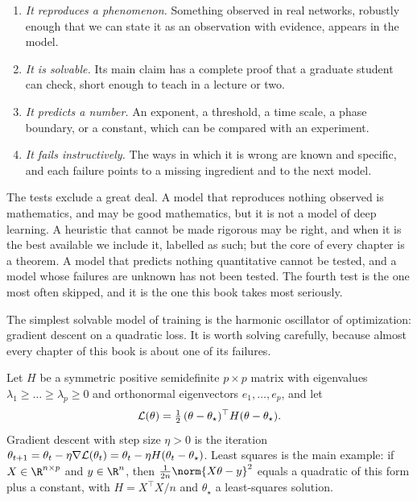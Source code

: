 \begin{refsection}
\begin{enumerate}
\item \emph{It reproduces a phenomenon.} Something observed in real networks, robustly enough that we can state it as an observation with evidence, appears in the model.
\item \emph{It is solvable.} Its main claim has a complete proof that a graduate student can check, short enough to teach in a lecture or two.
\item \emph{It predicts a number.} An exponent, a threshold, a time scale, a phase boundary, or a constant, which can be compared with an experiment.
\item \emph{It fails instructively.} The ways in which it is wrong are known and specific, and each failure points to a missing ingredient and to the next model.
\end{enumerate}

The tests exclude a great deal. A model that reproduces nothing observed is mathematics, and may be good mathematics, but it is not a model of deep learning. A heuristic that cannot be made rigorous may be right, and when it is the best available we include it, labelled as such; but the core of every chapter is a theorem. A model that predicts nothing quantitative cannot be tested, and a model whose failures are unknown has not been tested. The fourth test is the one most often skipped, and it is the one this book takes most seriously.


The simplest solvable model of training is the harmonic oscillator of optimization: gradient descent on a quadratic loss. It is worth solving carefully, because almost every chapter of this book is about one of its failures.

Let $H$ be a symmetric positive semidefinite $p\times p$ matrix with eigenvalues $\lambda_1\ge\dots\ge\lambda_p\ge0$ and orthonormal eigenvectors $e_1,\dots,e_p$, and let
\[
  \mathcal{L}(\theta)=\tfrac12\,(\theta-\theta_\star)^\top H(\theta-\theta_\star).
\]
Gradient descent with step size $\eta>0$ is the iteration $\theta_{t+1}=\theta_t-\eta\nabla\mathcal{L}(\theta_t)=\theta_t-\eta H(\theta_t-\theta_\star)$. Least squares is the main example: if $X\in\R^{n\times p}$ and $y\in\R^n$, then $\frac1{2n}\norm{X\theta-y}^2$ equals a quadratic of this form plus a constant, with $H=X^\top X/n$ and $\theta_\star$ a least-squares solution.


\end{refsection}
